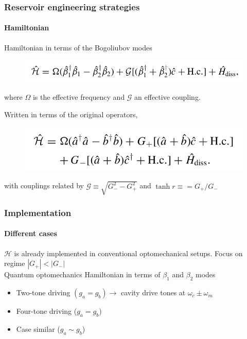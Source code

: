 \documentclass[aspectratio=43]{beamer}
\begin{document}
\begin{frame}
	
	\frametitle{Reservoir engineering strategies}
	\framesubtitle{Hamiltonian}
	
	Hamiltonian in terms of the Bogoliubov modes
	\begin{figure}
		\includegraphics[width = 8.5 cm]{plots/hamiltonian_3.png}
	\end{figure}	
	
	where $\Omega$ is the effective frequency and $\mathcal{G}$ an effective coupling.
	
	Written in terms of the original operators,
	\begin{figure}
		\includegraphics[width = 7.5 cm]{plots/hamiltonian_4.png}
	\end{figure}

	with couplings related by $\mathcal{G} \equiv \sqrt{G_{-}^{2} - G_{+}^{2}}$ and $\tanh r \equiv = G_{+}/G_{-}$

\end{frame}

\begin{frame}

	\frametitle{Implementation}
	\framesubtitle{Different cases}
	
		$\mathcal{H}$ is already implemented in conventional optomechanical setups. Focus on regime $|G_{+}|<|G_{-}|$\\
		Quantum optomechanics Hamiltonian in terms of $\beta_{1}$ and $\beta_{2}$ modes

	\begin{itemize}
		\item Two-tone driving $(g_{a} = g_{b}) \longrightarrow$ cavity drive tones at $\omega_{c} \pm \omega_{m}$ 
		\item Four-tone driving ($g_{a} = g_{b}$)
		\item Case similar ($g_{a} \sim g_{b}$)
	\end{itemize}	

\end{frame}
\end{document}
